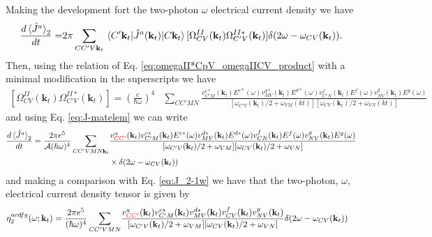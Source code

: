 \documentclass{article}
\newcommand{\kt}{\mathbf{k}_{t}}
\begin{document}
Making the development fort the two-photon $\omega$ electrical current density
we have
\begin{equation*}
\begin{split}
\frac{d \ev*{\hat{J}^{a}}_{2}}{dt} =& 2\pi \sum_{CC'V\kt} \mel*{C'\kt}
{\hat{J}^{a}(\kt)}{C\kt} [\Omega^{II}_{CV}(\kt) \Omega^{II*}_{C'V}(\kt)] 
\delta(2\omega - \omega_{CV}(\kt)) . \\
\end{split}
\end{equation*}
Then, using the relation of Eq. \eqref{eq:omegaII*CpV_omegaIICV_product} with a
minimal modification in the superscripts we have
\begin{equation}\label{eq:omegaII*CpV_omegaIICV_product-2}
\begin{split}
[\Omega^{II}_{CV}(\kt)\Omega^{II*}_{C'V}(\kt)] = \left(\frac{e}{\hbar \omega}
\right)^{4} &
\sum_{CC'MN} \frac{v^{c*}_{C'M}(\kt) E^{c*}(\omega)v^{d*}_{MV}(\kt) E^{d*}
(\omega)
v^{f}_{C'N}(\kt) E^{f}(\omega)v^{g}_{NV}(\kt) E^{g}(\omega)}
{[\omega_{C'V}(\kt)/2+\omega_{VM}(kt)][\omega_{CV}(\kt)/2+\omega_{VN}(kt)]}
\end{split}
\end{equation}
and using Eq. \eqref{eq:J-matelem} we can write
\begin{equation}
\begin{split}
\frac{d\ev*{\hat{J}^{a}}_{2}}{dt} = \frac{2 \pi e^{5}}{\mathcal{A} 
(\hbar \omega)^{4}} \sum_{CC'VMN\kt} & \frac{v^{a}_{\color{red}{CC'}}(\kt) 
v^{c*}_{C'M}(\kt)E^{c*}(\omega) v^{d*}_{MV}(\kt) E^{d*}(\omega) 
v^{f}_{CN}(\kt) E^{f}(\omega) v^{g}_{NV}(\kt) E^{g}(\omega) }
{[\omega_{C'V}(\kt)/2 + \omega_{VM}] [\omega_{CV}(\kt)/2 + \omega_{VN}]} \\
& \times \delta(2\omega - \omega_{CV}(\kt))
\end{split}
\end{equation}
and making a comparison with Eq. \eqref{eq:J_2-1w} we have that the two-photon,
$\omega$, electrical current density tensor is given by
\begin{equation}
\begin{split}
\eta^{acdfg}_{2}(\omega;\kt) = \frac{2 \pi e^{5}}{(\hbar \omega)^{4}} 
\sum_{CC'VMN} & \frac{v^{a}_{\color{red}{CC'}}(\kt) v^{c*}_{C'M}(\kt) 
v^{d*}_{MV}(\kt) v^{f}_{CV}(\kt) v^{g}_{NV}(\kt)} {[\omega_{C'V}(\kt)/2 + 
\omega_{VM}] [\omega_{CV}(\kt)/2 + \omega_{VN}]} \delta(2\omega - 
\omega_{CV}(\kt))
\end{split}
\end{equation}
\end{document}
